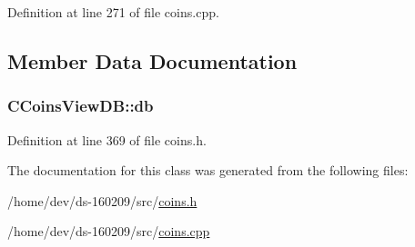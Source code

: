 Definition at line 271 of file coins.\+cpp.



\subsection{Member Data Documentation}
\hypertarget{class_c_coins_view_d_b_aba0a7b26fe82c1a2e80ca060d12fb66a}{}
\subsubsection[{db}]{ C\+Coins\+View\+D\+B\+::db\hspace{0.3cm}{\ttfamily [protected]}}\label{class_c_coins_view_d_b_aba0a7b26fe82c1a2e80ca060d12fb66a}


Definition at line 369 of file coins.\+h.



The documentation for this class was generated from the following files\+:\begin{DoxyCompactItemize}
\item 
/home/dev/ds-\/160209/src/\hyperlink{coins_8h}{coins.\+h}\item 
/home/dev/ds-\/160209/src/\hyperlink{coins_8cpp}{coins.\+cpp}\end{DoxyCompactItemize}
